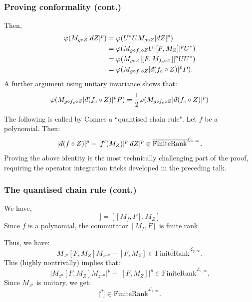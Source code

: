 \documentclass{beamer} %
\theoremstyle{definition} %
\newcommand{\Lc}{\mathcal{L}}
\newcommand{\FiniteRank}{\mathrm{FiniteRank}}
\newcommand{\SepPart}[1]{\overline{\FiniteRank}^{\Lc_{#1,\infty}}}
\def\qd{\,{\mathchar'26\mkern-12mu d}}
\begin{document}
\begin{frame}\frametitle{Proving conformality (cont.)}
    Then,
    \begin{align*}
        \varphi(M_{g\circ Z}|\qd Z|^p) &= \varphi(U^*UM_{g\circ Z}|\qd Z|^p)\\
                                       &= \varphi(M_{g\circ f_c\circ Z}U|[F,M_{Z}]|^pU^*)\\
                                       &= \varphi(M_{g\circ Z}|[F,M_{f_c\circ Z}]|^pUU^*)\\
                                       &= \varphi(M_{g\circ f_c\circ Z}|\qd (f_c\circ Z)|^pP).
    \end{align*}
    A further argument using unitary invariance shows that:
    \begin{align*}
        \varphi(M_{g\circ f_c\circ Z}|\qd (f_c\circ Z)|^pP) = \frac{1}{2}\varphi(M_{g\circ f_c\circ Z}|\qd (f_c\circ Z)|^p)
    \end{align*}
\end{frame}


\begin{frame}\label{The quantised chain rule}
    The following is called by Connes a ``quantised chain rule". Let $f$ be a polynomial. Then:
    \begin{equation*}
        |\qd (f\circ Z)|^p-|f'(M_Z)|^p|\qd Z|^p \in \SepPart{1}.
    \end{equation*}
    Proving the above identity is the most technically challenging part of the proof, requiring the operator integration tricks developed in the preceding talk.
\end{frame}

\begin{frame}\frametitle{The quantised chain rule (cont.)}
    We have,
    \begin{equation*}
        [M_f,[F,M_Z]] = [[M_f,F],M_Z]
    \end{equation*}
    Since $f$ is a polynomial, the commutator $[M_f,F]$ is finite rank.
    
    Thus, we have:
    \begin{equation*}
        M_{z^n}[F,M_Z]M_{z^{-n}}-[F,M_Z] \in \SepPart{p}. 
    \end{equation*}
    This (highly nontrivally) implies that:
    \begin{equation*}
         |M_{z^n}[F,M_Z]M_{z^{-n}}|^p-|[F,M_Z]|^p \in \SepPart{1}.
    \end{equation*}
    Since $M_{z^n}$ is unitary, we get:
    \begin{equation*}
        [M_{z^n},|[F,M_Z]|^p] \in \SepPart{1}.
    \end{equation*}
\end{frame}
\end{document}
